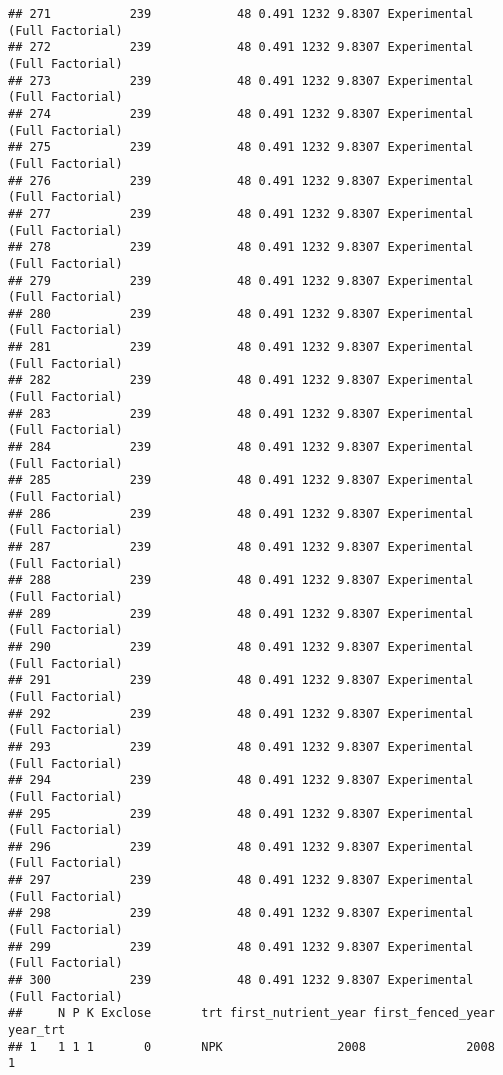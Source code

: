 \documentclass[]{article}
\begin{document}
\begin{verbatim}
## 271           239            48 0.491 1232 9.8307 Experimental (Full Factorial)
## 272           239            48 0.491 1232 9.8307 Experimental (Full Factorial)
## 273           239            48 0.491 1232 9.8307 Experimental (Full Factorial)
## 274           239            48 0.491 1232 9.8307 Experimental (Full Factorial)
## 275           239            48 0.491 1232 9.8307 Experimental (Full Factorial)
## 276           239            48 0.491 1232 9.8307 Experimental (Full Factorial)
## 277           239            48 0.491 1232 9.8307 Experimental (Full Factorial)
## 278           239            48 0.491 1232 9.8307 Experimental (Full Factorial)
## 279           239            48 0.491 1232 9.8307 Experimental (Full Factorial)
## 280           239            48 0.491 1232 9.8307 Experimental (Full Factorial)
## 281           239            48 0.491 1232 9.8307 Experimental (Full Factorial)
## 282           239            48 0.491 1232 9.8307 Experimental (Full Factorial)
## 283           239            48 0.491 1232 9.8307 Experimental (Full Factorial)
## 284           239            48 0.491 1232 9.8307 Experimental (Full Factorial)
## 285           239            48 0.491 1232 9.8307 Experimental (Full Factorial)
## 286           239            48 0.491 1232 9.8307 Experimental (Full Factorial)
## 287           239            48 0.491 1232 9.8307 Experimental (Full Factorial)
## 288           239            48 0.491 1232 9.8307 Experimental (Full Factorial)
## 289           239            48 0.491 1232 9.8307 Experimental (Full Factorial)
## 290           239            48 0.491 1232 9.8307 Experimental (Full Factorial)
## 291           239            48 0.491 1232 9.8307 Experimental (Full Factorial)
## 292           239            48 0.491 1232 9.8307 Experimental (Full Factorial)
## 293           239            48 0.491 1232 9.8307 Experimental (Full Factorial)
## 294           239            48 0.491 1232 9.8307 Experimental (Full Factorial)
## 295           239            48 0.491 1232 9.8307 Experimental (Full Factorial)
## 296           239            48 0.491 1232 9.8307 Experimental (Full Factorial)
## 297           239            48 0.491 1232 9.8307 Experimental (Full Factorial)
## 298           239            48 0.491 1232 9.8307 Experimental (Full Factorial)
## 299           239            48 0.491 1232 9.8307 Experimental (Full Factorial)
## 300           239            48 0.491 1232 9.8307 Experimental (Full Factorial)
##     N P K Exclose       trt first_nutrient_year first_fenced_year year_trt
## 1   1 1 1       0       NPK                2008              2008        1

\end{verbatim}
\end{document}
